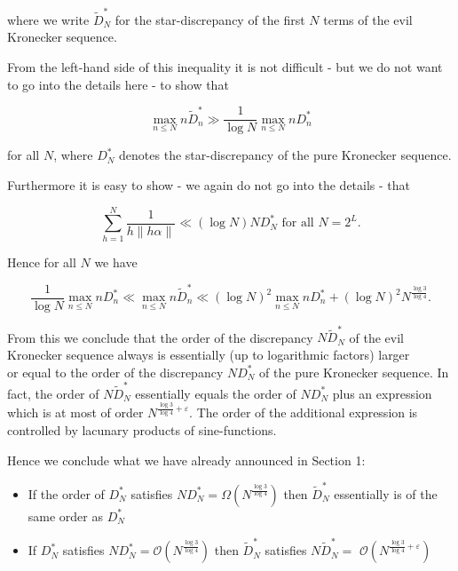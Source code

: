 \documentclass[10pt]{article}
\begin{document}
where we write $\widetilde{D}_{N}^{*}$ for the star-discrepancy of the first $N$ terms of the evil Kronecker sequence.

From the left-hand side of this inequality it is not difficult - but we do not want to go into the details here - to show that

$$
\max _{n \leqslant N} n \widetilde{D}_{n}^{*} \gg \frac{1}{\log N} \max _{n \leqslant N} n D_{n}^{*}
$$

for all $N$, where $D_{N}^{*}$ denotes the star-discrepancy of the pure Kronecker sequence.

Furthermore it is easy to show - we again do not go into the details - that

$$
\sum_{h=1}^{N} \frac{1}{h\|h \alpha\|} \ll(\log N) N D_{N}^{*} \text { for all } N=2^{L} .
$$

Hence for all $N$ we have


\begin{equation*}
\frac{1}{\log N} \max _{n \leqslant N} n D_{n}^{*} \ll \max _{n \leqslant N} n \widetilde{D}_{n}^{*} \ll(\log N)^{2} \max _{n \leqslant N} n D_{n}^{*}+(\log N)^{2} N^{\frac{\log 3}{\log 4}} . \tag{6.2}
\end{equation*}


From this we conclude that the order of the discrepancy $N \widetilde{D}_{N}^{*}$ of the evil Kronecker sequence always is essentially (up to logarithmic factors) larger\\
or equal to the order of the discrepancy $N D_{N}^{*}$ of the pure Kronecker sequence. In fact, the order of $N \widetilde{D}_{N}^{*}$ essentially equals the order of $N D_{N}^{*}$ plus an expression which is at most of order $N^{\frac{\log 3}{\log 4}+\varepsilon}$. The order of the additional expression is controlled by lacunary products of sine-functions.

Hence we conclude what we have already announced in Section 1:

\begin{itemize}
  \item[-] If the order of $D_{N}^{*}$ satisfies $N D_{N}^{*}=\Omega\left(N^{\frac{\log 3}{\log 4}}\right)$ then $\widetilde{D}_{N}^{*}$ essentially is of the same order as $D_{N}^{*}$
  \item[-] If $D_{N}^{*}$ satisfies $N D_{N}^{*}=\mathcal{O}\left(N^{\frac{\log 3}{\log 4}}\right)$ then $\widetilde{D}_{N}^{*}$ satisfies $N \widetilde{D}_{N}^{*}=$ $\mathcal{O}\left(N^{\frac{\log 3}{\log 4}+\varepsilon}\right)$
\end{itemize}
\end{document}
